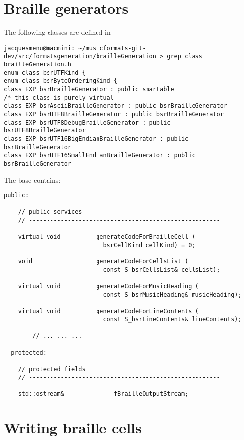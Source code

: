 \section{Braille generators}

The following classes are defined in 
\begin{lstlisting}[language=Terminal]
jacquesmenu@macmini: ~/musicformats-git-dev/src/formatsgeneration/brailleGeneration > grep class   brailleGeneration.h
enum class bsrUTFKind {
enum class bsrByteOrderingKind {
class EXP bsrBrailleGenerator : public smartable
/* this class is purely virtual
class EXP bsrAsciiBrailleGenerator : public bsrBrailleGenerator
class EXP bsrUTF8BrailleGenerator : public bsrBrailleGenerator
class EXP bsrUTF8DebugBrailleGenerator : public bsrUTF8BrailleGenerator
class EXP bsrUTF16BigEndianBrailleGenerator : public bsrBrailleGenerator
class EXP bsrUTF16SmallEndianBrailleGenerator : public bsrBrailleGenerator
\end{lstlisting}

The base  contains:
\begin{lstlisting}[language=CPlusPlus]
  public:

    // public services
    // ------------------------------------------------------

    virtual void          generateCodeForBrailleCell (
                            bsrCellKind cellKind) = 0;

    void                  generateCodeForCellsList (
                            const S_bsrCellsList& cellsList);

    virtual void          generateCodeForMusicHeading (
                            const S_bsrMusicHeading& musicHeading);

    virtual void          generateCodeForLineContents (
                            const S_bsrLineContents& lineContents);

		// ... ... ...

  protected:

    // protected fields
    // ------------------------------------------------------

    std::ostream&              fBrailleOutputStream;
\end{lstlisting}


\section{Writing braille cells}

